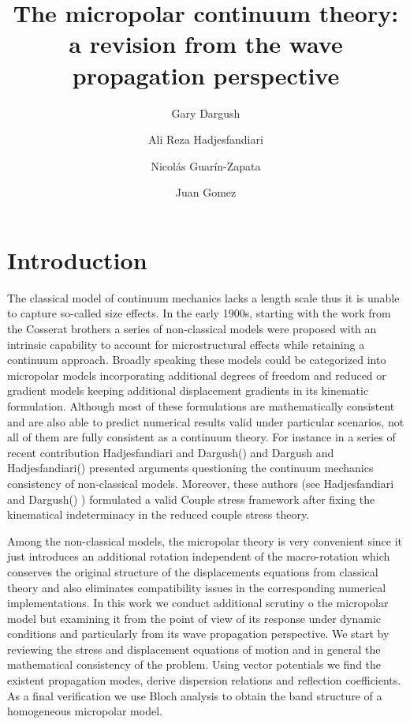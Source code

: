 \documentclass[12pt]{article}
\title{\textbf{The micropolar continuum theory: a revision from the wave propagation perspective}}
\author{Gary Dargush \and Ali Reza Hadjesfandiari \and Nicolás Guarín-Zapata \and Juan Gomez}
\begin{document}
\maketitle

\section{Introduction}
The classical model of continuum mechanics lacks a length scale thus it is unable to capture so-called size effects. In the early 1900s, starting with the work from the Cosserat brothers \citep{Cosserat1909} a series of non-classical models were proposed with an intrinsic capability to account for microstructural effects while retaining a continuum approach. Broadly speaking these models could be categorized into micropolar models incorporating additional degrees of freedom and reduced or gradient models keeping additional displacement gradients in its kinematic formulation. Although most of these formulations are mathematically consistent and are also able to predict numerical results valid under particular scenarios, not all of them are fully consistent as a continuum theory. For instance in a series of recent contribution Hadjesfandiari and Dargush() and Dargush and Hadjesfandiari() presented arguments questioning the continuum mechanics consistency of non-classical models. Moreover, these authors (see Hadjesfandiari and Dargush() ) formulated a valid Couple stress framework after fixing the kinematical indeterminacy in the reduced couple stress theory.

Among the non-classical models, the micropolar theory \citep{Eringen1966} is very convenient since it just introduces an additional rotation independent of the macro-rotation which conserves the original structure of the displacements equations from classical theory and also eliminates compatibility issues in the corresponding numerical implementations. In this work we conduct additional scrutiny o the micropolar model but examining it from the point of view of its response under dynamic conditions and particularly from its wave propagation perspective. We start by reviewing the stress and displacement equations of motion and in general the mathematical consistency of the problem. Using vector potentials we find the existent propagation modes, derive dispersion relations and reflection coefficients. As a final verification we use Bloch analysis to obtain the band structure of a homogeneous micropolar model.
\end{document}
